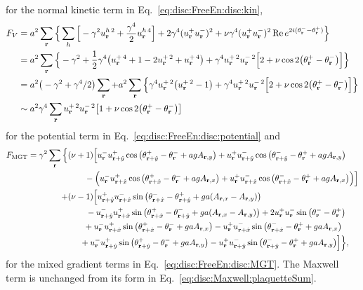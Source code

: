 for the normal kinetic term in Eq.~\eqref{eq:disc:FreeEn:disc:kin},
\begin{equation}
  \begin{split}
	F_V &= a^2\sum_\v{r}\Big\{\sum_h\Big[-\gamma^2u^{h\,2}_\v{r} + \frac{\gamma^4}{2}u^{h\,4}_\v{r}\Big] + 2\gamma^4(u^+_\v{r}u^-_\v{r})^2 + \nu\gamma^4(u^+_\v{r}u^-_\v{r})^2\Re e^{2i(\theta^-_\v{r}-\theta^+_\v{r})}\Big\}\\
	&= a^2\sum_\v{r}\Big\{-\gamma^2 + \frac{1}{2}\gamma^4\big(u^{+\,4}_\v{r} + 1 - 2u^{+\,2}_\v{r} + u^{+\,4}_\v{r}\big) + \gamma^4u^{+\,2}_\v{r}u^{-\,2}_\v{r}\Big[2+\nu\cos 2\big(\theta^+_\v{r}-\theta^-_\v{r}\big)\Big]\Big\}\\
	&= a^2\big(-\gamma^2 + \gamma^4/2\big)\sum_\v{r} + a^2\sum_\v{r}\Big\{\gamma^4u^{+\,2}_\v{r}\big( u^{+\,2}_\v{r}-1\big) + \gamma^4u^{+\,2}_\v{r}u^{-\,2}_\v{r}\Big[2+\nu\cos 2\big(\theta^+_\v{r}-\theta^-_\v{r}\big)\Big]\Big\}\\
	&\sim a^2\gamma^4\sum_\v{r}u^{+\,2}_\v{r}u^{-\,2}_\v{r}\big[1+\nu\cos 2\big(\theta^+_\v{r}-\theta^-_\v{r}\big)\big]
  \end{split}
  \label{eq:disc:cp1:FV}
\end{equation}
for the potential term in Eq.~\eqref{eq:disc:FreeEn:disc:potential} and
\begin{equation}
  \begin{split}
	F_\text{MGT} = \gamma^2\sum_\v{r}\Big\{&(\nu+1)\Big[u^-_\v{r}u^+_{\v{r}+\hat{y}}\cos\big(\theta^+_{\v{r}+\hat{y}} - \theta^-_\v{r} + agA_{\v{r},y}\big)
+ u^+_\v{r}u^-_{\v{r}+\hat{y}}\cos\big(\theta^-_{\v{r} + \hat{y}} - \theta^+_\v{r} + agA_{\v{r},y}\big)\\
&\phantom{(\nu+}\;-\Big( u^-_\v{r}u^+_{\v{r}+\hat{x}}\cos\big(\theta^+_{\v{r}+\hat{x}} - \theta^-_\v{r} + agA_{\v{r},x}\big)
+ u^+_\v{r}u^-_{\v{r}+\hat{x}}\cos\big(\theta^-_{\v{r} + \hat{x}} - \theta^+_\v{r} + agA_{\v{r},x}\big)\Big)\Big]\\
+&(\nu-1)\Big[u^+_{\v{r}+\hat{y}}u^-_{\v{r}+\hat{x}}\sin\big(\theta^-_{\v{r}+\hat{x}} - \theta^+_{\v{r}+\hat{y}} + ga(A_{\v{r},x} - A_{\v{r},y})\big)\\
  &\phantom{(\nu+}\;\,-u^-_{\v{r}+\hat{y}}u^+_{\v{r}+\hat{x}}\sin\big(\theta^+_{\v{r}+\hat{x}} - \theta^-_{\v{r}+\hat{y}} + ga(A_{\v{r},x} - A_{\v{r},y})\big) + 2u^+_\v{r}u^-_\v{r}\sin\big(\theta^-_\v{r}-\theta^+_\v{r}\big)\\
  &\phantom{(\nu0}\;\,+u^-_\v{r}u^+_{\v{r}+\hat{x}}\sin\big(\theta^+_{\v{r}+\hat{x}} - \theta^-_\v{r}+gaA_{\v{r},x}\big)
  -u^+_\v{r}u^-_{\v{r}+\hat{x}}\sin\big(\theta^-_{\v{r}+\hat{x}} - \theta^+_\v{r}+gaA_{\v{r},x}\big)\\
  &\phantom{(\nu0}+u^-_\v{r}u^+_{\v{r}+\hat{y}}\sin\big(\theta^+_{\v{r}+\hat{y}} - \theta^-_\v{r}+gaA_{\v{r},y}\big)
-u^+_\v{r}u^-_{\v{r}+\hat{y}}\sin\big(\theta^-_{\v{r}+\hat{y}} - \theta^+_\v{r}+gaA_{\v{r},y}\big)\Big]\Big\},
  \end{split}
  \label{eq:disc:cp1:MGT}
\end{equation}
for the mixed gradient terms in Eq.~\eqref{eq:disc:FreeEn:disc:MGT}. The Maxwell term is unchanged from its form in Eq.~\eqref{eq:disc:Maxwell:plaquetteSum}.

